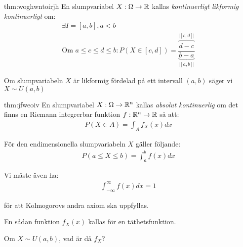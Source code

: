 \par\bigskip
\begin{theo}{thm:woghwntoirjh}
  En slumpvariabel $X:\Omega\to\mathbb{R}$ kallas \textit{kontinuerligt likformig kontinuerligt} om:
  \begin{equation*}
    \begin{gathered}
      \exists I=[a,b],a<b\\
      \text{Om } a\leq c\leq d\leq b: P\left(X\in[c,d]\right)=\dfrac{\overbrace{d-c}^{\text{$\left|[c,d]\right|$}}}{\underbrace{b-a}_{\text{$\left|[a,b]\right|$}}}
    \end{gathered}
  \end{equation*}
\end{theo}
\par\bigskip
\noindent Om slumpvariabeln $X$ är likformig fördelad på ett intervall $(a,b)$ säger vi $X\sim U(a,b)$
\begin{theo}{thm:jfweoiv}
  En slumpvariabel $X:\Omega\to\mathbb{R}^n$ kallas \textit{absolut kontinuerlig} om det finns en Riemann integrerbar funktion $f:\mathbb{R}^n\to\mathbb{R}$ så att:
  \begin{equation*}
    \begin{gathered}
      P\left(X\in A\right) = \int_{A}f_X(x)dx
    \end{gathered}
  \end{equation*}\par
  \noindent För den endimensionella slumpvariabeln $X$ gäller följande:
  \begin{equation*}
    \begin{gathered}
      P(a\leq X\leq b) = \int_{a}^{b}f(x)dx
    \end{gathered}
  \end{equation*}\par
  \noindent Vi måste även ha:
  \begin{equation*}
    \begin{gathered}
      \int_{-\infty}^{\infty}f(x)dx=1
    \end{gathered}
  \end{equation*}\par
  \noindent för att Kolmogorovs andra axiom ska uppfyllas. \par
  \noindent En sådan funktion $f_X(x)$ kallas för en täthetsfunktion. \par
\end{theo}
\par\bigskip
\noindent Om $X\sim U(a,b)$, vad är då $f_X$?\par
